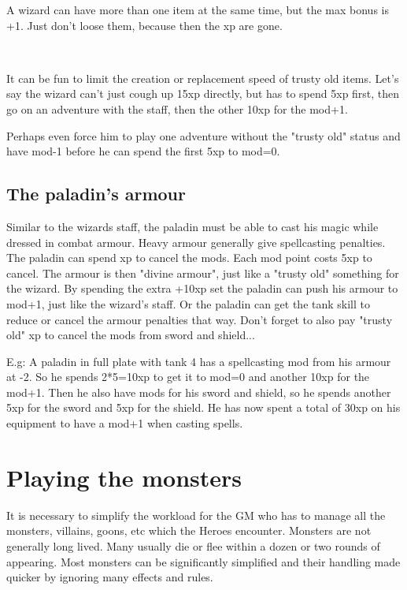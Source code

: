 A wizard can have more than one item at the same time, but the max bonus is +1. Just don't loose them, because then the xp are gone.

\

It can be fun to limit the creation or replacement speed of trusty old items. Let's say the wizard can't just cough up 15xp directly, but has to spend 5xp first, then go on an adventure with the staff, then the other 10xp for the mod+1.

Perhaps even force him to play one adventure without the "trusty old" status and have mod-1 before he can spend the first 5xp to mod=0.


\subsection*{The paladin's armour}
Similar to the wizards staff, the paladin must be able to cast his magic while dressed in combat armour. Heavy armour generally give spellcasting penalties. The paladin can spend xp to cancel the mods. Each mod point costs 5xp to cancel. The armour is then "divine armour", just like a "trusty old" something for the wizard. By spending the extra +10xp set the paladin can push his armour to mod+1, just like the wizard's staff.
Or the paladin can get the tank skill to reduce or cancel the armour penalties that way.
Don't forget to also pay "trusty old" xp to cancel the mods from sword and shield...

E.g: A paladin in full plate with tank 4 has a spellcasting mod from his armour at -2. So he spends 2*5=10xp to get it to mod=0 and another 10xp for the mod+1. Then he also have mods for his sword and shield, so he spends another 5xp for the sword and 5xp for the shield. He has now spent a total of 30xp on his equipment to have a mod+1 when casting spells.












\section*{Playing the monsters}
It is necessary to simplify the workload for the GM who has to manage all the monsters, villains, goons, etc which the Heroes encounter. Monsters are not generally long lived. Many usually die or flee within a dozen or two rounds of appearing. Most monsters can be significantly simplified and their handling made quicker by ignoring many effects and rules.


